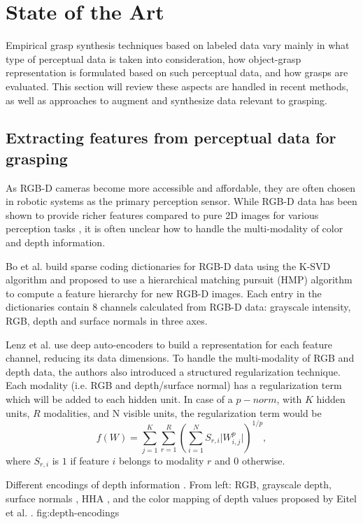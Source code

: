 
\chapter{State of the Art}

Empirical grasp synthesis techniques based on labeled data vary mainly in what type of perceptual data is taken into
consideration, how object-grasp representation is formulated based on such perceptual data, and how grasps are
evaluated. This section will review these aspects are handled in recent methods, as well as approaches to augment and
synthesize data relevant to grasping.


\section{Extracting features from perceptual data for grasping}
As RGB-D cameras become more accessible and affordable, they are often chosen in robotic systems as the primary
perception sensor. While RGB-D data has been shown to provide richer features compared to pure 2D images for various
perception tasks \cite{lenz2015,Eitel2015,Gupta2014RGBDFeatures,jiang2011}, it is often unclear how to handle the
multi-modality of color and depth information.

Bo et al. \cite{Bo2013} build sparse coding dictionaries for RGB-D data using the K-SVD algorithm and proposed to use
a hierarchical matching pursuit (HMP)  algorithm to compute a feature hierarchy for new RGB-D images. Each entry in the
dictionaries contain 8 channels calculated from RGB-D data: grayscale intensity, RGB, depth and surface normals in three
axes.

Lenz et al. \cite{lenz2015} use deep auto-encoders to build a representation for each feature channel, reducing its data
dimensions. To handle the multi-modality of RGB and depth data, the authors also introduced a structured regularization
technique. Each modality (i.e. RGB and depth/surface normal) has a regularization term which will be added to each
hidden unit. In case of a $p-norm$, with $K$ hidden units, $R$ modalities, and N visible units, the regularization term
would be
\[f(W) = \sum\limits^K_{j=1} \sum\limits^R_{r=1} \left( \sum\limits^N_{i=1} S_{r,i} \lvert W^p_{i,j} \rvert \right)
^{1/p}, \]
where $S_{r,i}$ is $1$ if feature $i$ belongs to modality $r$ and $0$ otherwise.

             {Different encodings of depth information \cite{Eitel2015}. From left: RGB, grayscale depth, surface
              normals \cite{Bo2013}, HHA \cite{Gupta2014RGBDFeatures}, and the color mapping of depth values proposed
              by Eitel et al. \cite{Eitel2015}.}
             {fig:depth-encodings}{\linewidth}

